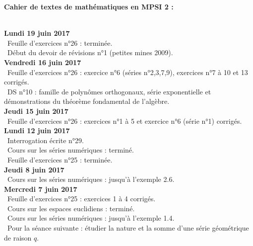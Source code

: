 \documentclass[12pt,a4paper]{article}
\begin{document}
\begin{center}
\Large\bf Cahier de textes de mathématiques en MPSI 2 :
\end{center}
\vspace{1cm}
\vspace{.4cm}\\

\noindent\textbf{Lundi 19 juin 2017}\\
\bu\ Feuille d'exercices n°26 :  terminée.\\
\bu\ Début du devoir de révisions n°1 (petites mines 2009).\vspace{.4cm}\\

\noindent\textbf{Vendredi 16 juin 2017}\\
\bu\ Feuille d'exercices n°26 :  exercice n°6 (séries n°2,3,7,9), exercices n°7 à 10 et 13 corrigés.\\
\bu\ DS n°10 : famille de polynômes orthogonaux, série exponentielle et démonstrations du théorème fondamental de l'algèbre.\vspace{.4cm}\\

\noindent\textbf{Jeudi 15 juin 2017}\\
\bu\ Feuille d'exercices n°26 : exercices n°1 à 5 et exercice n°6 (série n°1) corrigés.\vspace{.4cm}\\

\noindent\textbf{Lundi 12 juin 2017}\\
\bu\ Interrogation écrite n°29.\\
\bu\ Cours sur les séries numériques : terminé.\\
\bu\ Feuille d'exercices n°25 : terminée.\vspace{.4cm}\\

\noindent\textbf{Jeudi 8 juin 2017}\\
\bu\ Cours sur les séries numériques : jusqu'à l'exemple 2.6.\vspace{.4cm}\\

\noindent\textbf{Mercredi 7 juin 2017}\\
\bu\ Feuille d'exercices n°25 : exercices 1 à 4 corrigés.\\
\bu\ Cours sur les espaces euclidiens : terminé.\\
\bu\ Cours sur les séries numériques : jusqu'à l'exemple 1.4.\\
\bu\ Pour la séance suivante : étudier la nature et la somme d'une série géométrique de raison $q$.\vspace{.4cm}\\
\end{document}
